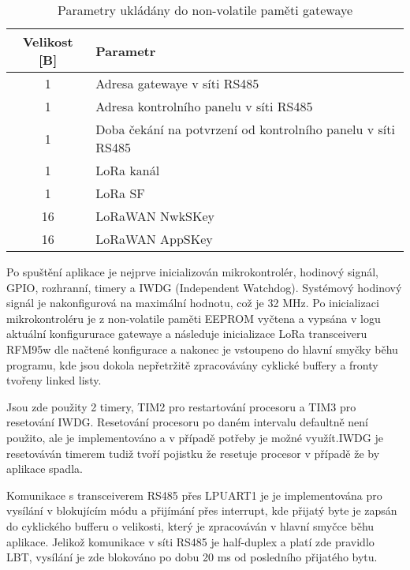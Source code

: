 \begin{table}[!h]
    \centering
    \begin{ctucolortab}
            \begin{tabular}{ |c|p{7cm}| }
    \hline

    Velikost [B]          & Parametr           \\ \hline \hline
    1    & Adresa gatewaye v síti RS485       \\    \hline
    1    & Adresa kontrolního panelu v síti RS485       \\  \hline
    1    & Doba čekání na potvrzení od kontrolního panelu v síti RS485       \\ \hline
    1    & LoRa kanál       \\  \hline
    1    & LoRa SF       \\ \hline
    16    & LoRaWAN NwkSKey       \\ \hline
    16    & LoRaWAN AppSKey       \\ \hline
 
    \end{tabular}
    \end{ctucolortab}
    \caption{Parametry ukládány do non-volatile paměti gatewaye}
    \label{table:Parametry ukládány do non-volatile paměti gatewaye}
\end{table}


Po spuštění aplikace je nejprve inicializován mikrokontrolér, hodinový signál, GPIO, rozhranní, timery a IWDG (Independent Watchdog). Systémový hodinový signál je nakonfigurová na maximální hodnotu, což je 32 MHz. Po inicializaci mikrokontroléru je z non-volatile paměti EEPROM vyčtena a vypsána v logu aktuální konfigururace gatewaye a následuje inicializace LoRa transceiveru RFM95w dle načtené konfigurace a nakonec je vstoupeno do hlavní smyčky běhu programu, kde jsou dokola nepřetržitě zpracovávány cyklické buffery a fronty tvořeny linked listy. 

Jsou zde použity 2 timery, TIM2 pro restartování procesoru a TIM3 pro resetování IWDG.
Resetování procesoru po daném intervalu defaultně není použito, ale je implementováno a v případě potřeby je možné využít.IWDG je resetováván timerem tudiž tvoří pojistku že resetuje procesor v případě že by aplikace spadla.

Komunikace s transceiverem RS485 přes LPUART1 je je implementována pro vysílání v blokujícím módu a přijímání přes interrupt, kde přijatý byte je zapsán do cyklického bufferu o velikosti, který je zpracováván v hlavní smyčce běhu aplikace. 
Jelikož komunikace v síti RS485 je half-duplex a platí zde pravidlo LBT, vysílání je zde blokováno po dobu 20 ms od posledního přijatého bytu.

